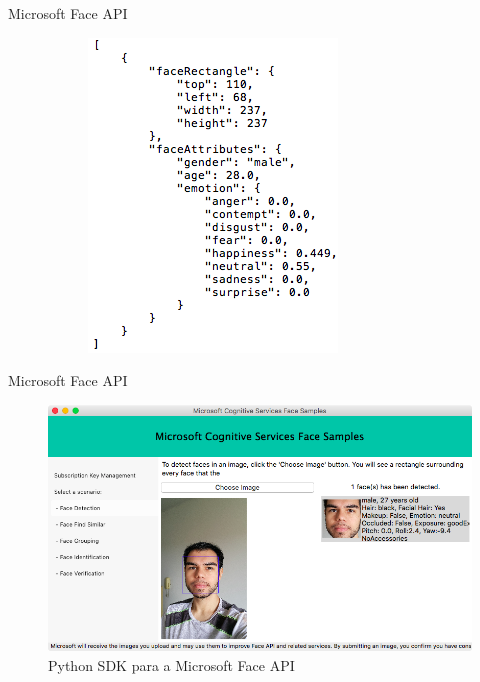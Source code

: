 \begin{frame}{Microsoft Face API}
\begin{figure}[htbp]
\begin{subfigure}[c]{0.48\textwidth}
    \includegraphics[height=\textheight,width=\textwidth,keepaspectratio]{imagens/msft_face_api_json_2.png}
    \end{subfigure}
\end{figure}
\end{frame}


\begin{frame}{Microsoft Face API}
\begin{figure}[htbp]
    \caption{Python SDK para a Microsoft Face API}
    \centering
    \includegraphics[width=0.8\linewidth]{imagens/msft_face_api_test.png}
\end{figure}
\end{frame}